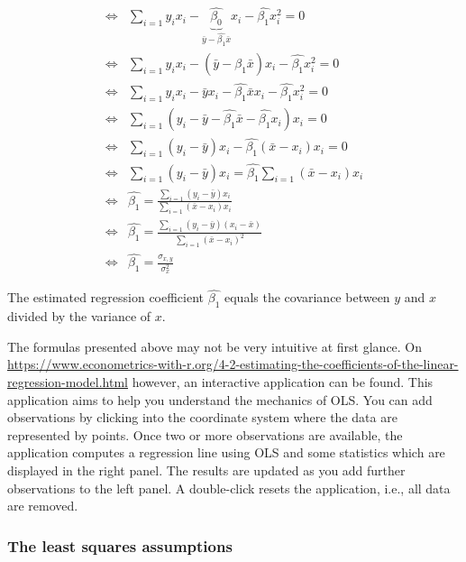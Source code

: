 {\begin{align*}
	\Leftrightarrow & \sum_{i=1}	y_i x_i- \underbrace{\hat{\beta_{0}}}_{\bar{y}-\hat{\beta_{1}}\bar{x}}x_i - \hat{\beta_{1}} x_i^2=0\\
	\Leftrightarrow & \sum_{i=1}	y_i x_i- (\bar{y}-\hat{\beta_{1}}\bar{x})x_i - \hat{\beta_{1}} x_i^2=0\\	
	\Leftrightarrow & \sum_{i=1}	y_i x_i- \bar{y}x_i-\hat{\beta_{1}}\bar{x}x_i - \hat{\beta_{1}} x_i^2=0\\	
	\Leftrightarrow & \sum_{i=1}	(y_i - \bar{y}-\hat{\beta_{1}}\bar{x} - \hat{\beta_{1}} x_i)x_i=0\\	
	\Leftrightarrow & \sum_{i=1} (y_i - \bar{y}) x_i -\hat{\beta_{1}}(\bar{x} -  x_i)x_i =0\\
	\Leftrightarrow & \sum_{i=1}	(y_i - \bar{y}) x_i  =  \hat{\beta_{1}} \sum_{i=1} (\bar{x} -  x_i) x_i \\
	\Leftrightarrow & \hat{\beta_{1}} =\frac{\sum_{i=1}(y_i - \bar{y})x_i }{ \sum_{i=1} (\bar{x} -  x_i)x_i }\\
		\Leftrightarrow & \hat{\beta_{1}} =\frac{\sum_{i=1}(y_i -\bar{y})(x_i-\bar{x})}{\sum_{i=1} (\bar{x} -  x_i)^2 }\\
	\Leftrightarrow & \hat{\beta_{1}} ={\frac {\sigma_{x,y}}{\sigma^2_{x}}}
\end{align*}
\item The estimated regression coefficient $\hat{\beta_{1}}$ equals the covariance between $y$ and $x$ divided by the variance of $x$.
\item The formulas presented above may not be very intuitive at first glance. On \url{https://www.econometrics-with-r.org/4-2-estimating-the-coefficients-of-the-linear-regression-model.html} however, an interactive application can be found. This application aims to help you understand the mechanics of OLS. You can add observations by clicking into the coordinate system where the data are represented by points. Once two or more observations are available, the application computes a regression line using OLS and some statistics which are displayed in the right panel. The results are updated as you add further observations to the left panel. A double-click resets the application, i.e., all data are removed.
}



\subsubsection*{The least squares assumptions}

